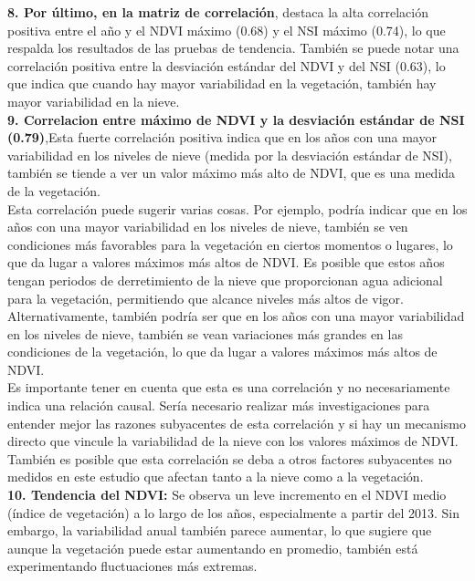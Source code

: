 {\textbf{8.	Por último, en la matriz de correlación}, destaca la alta correlación positiva entre el año y el NDVI máximo (0.68) y el NSI máximo (0.74), lo que respalda los resultados de las pruebas de tendencia. También se puede notar una correlación positiva entre la desviación estándar del NDVI y del NSI (0.63), lo que indica que cuando hay mayor variabilidad en la vegetación, también hay mayor variabilidad en la nieve.\\

\textbf{9.	Correlacion entre máximo de NDVI y la desviación estándar de NSI (0.79)},Esta fuerte correlación positiva indica que en los años con una mayor variabilidad en los niveles de nieve (medida por la desviación estándar de NSI), también se tiende a ver un valor máximo más alto de NDVI, que es una medida de la vegetación.\\

Esta correlación puede sugerir varias cosas. Por ejemplo, podría indicar que en los años con una mayor variabilidad en los niveles de nieve, también se ven condiciones más favorables para la vegetación en ciertos momentos o lugares, lo que da lugar a valores máximos más altos de NDVI. Es posible que estos años tengan periodos de derretimiento de la nieve que proporcionan agua adicional para la vegetación, permitiendo que alcance niveles más altos de vigor.\\

Alternativamente, también podría ser que en los años con una mayor variabilidad en los niveles de nieve, también se vean variaciones más grandes en las condiciones de la vegetación, lo que da lugar a valores máximos más altos de NDVI.\\

Es importante tener en cuenta que esta es una correlación y no necesariamente indica una relación causal. Sería necesario realizar más investigaciones para entender mejor las razones subyacentes de esta correlación y si hay un mecanismo directo que vincule la variabilidad de la nieve con los valores máximos de NDVI. También es posible que esta correlación se deba a otros factores subyacentes no medidos en este estudio que afectan tanto a la nieve como a la vegetación.\\

\textbf{10.	Tendencia del NDVI:} Se observa un leve incremento en el NDVI medio (índice de vegetación) a lo largo de los años, especialmente a partir del 2013. Sin embargo, la variabilidad anual también parece aumentar, lo que sugiere que aunque la vegetación puede estar aumentando en promedio, también está experimentando fluctuaciones más extremas.\\

}
